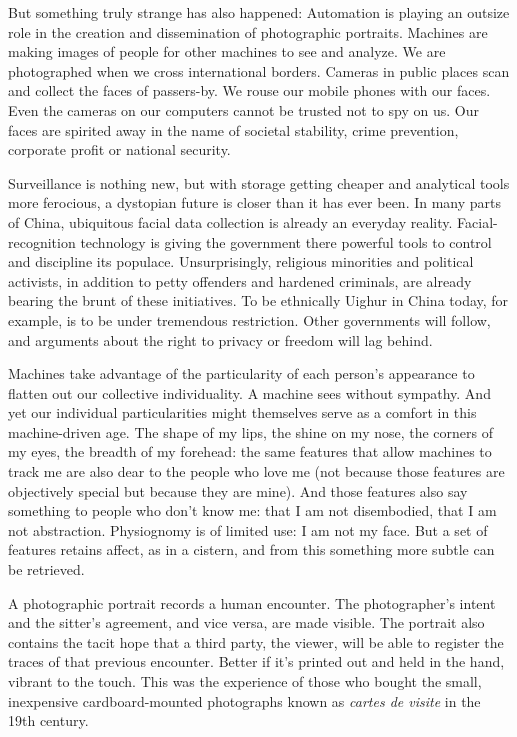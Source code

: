 But something truly strange has also happened: Automation is playing an
outsize role in the creation and dissemination of photographic
portraits. Machines are making images of people for other machines to
see and analyze. We are photographed when we cross international
borders. Cameras in public places scan and collect the faces of
passers-by. We rouse our mobile phones with our faces. Even the cameras
on our computers cannot be trusted not to spy on us. Our faces are
spirited away in the name of societal stability, crime prevention,
corporate profit or national security.

Surveillance is nothing new, but with storage getting cheaper and
analytical tools more ferocious, a dystopian future is closer than it
has ever been. In many parts of China, ubiquitous facial data collection
is already an everyday reality. Facial-recognition technology is giving
the government there powerful tools to control and discipline its
populace. Unsurprisingly, religious minorities and political activists,
in addition to petty offenders and hardened criminals, are already
bearing the brunt of these initiatives. To be ethnically Uighur in China
today, for example, is to be under tremendous restriction. Other
governments will follow, and arguments about the right to privacy or
freedom will lag behind.

Machines take advantage of the particularity of each person's appearance
to flatten out our collective individuality. A machine sees without
sympathy. And yet our individual particularities might themselves serve
as a comfort in this machine-driven age. The shape of my lips, the shine
on my nose, the corners of my eyes, the breadth of my forehead: the same
features that allow machines to track me are also dear to the people who
love me (not because those features are objectively special but because
they are mine). And those features also say something to people who
don't know me: that I am not disembodied, that I am not abstraction.
Physiognomy is of limited use: I am not my face. But a set of features
retains affect, as in a cistern, and from this something more subtle can
be retrieved.

A photographic portrait records a human encounter. The photographer's
intent and the sitter's agreement, and vice versa, are made visible. The
portrait also contains the tacit hope that a third party, the viewer,
will be able to register the traces of that previous encounter. Better
if it's printed out and held in the hand, vibrant to the touch. This was
the experience of those who bought the small, inexpensive
cardboard-mounted photographs known as \emph{cartes de visite} in the
19th century.

